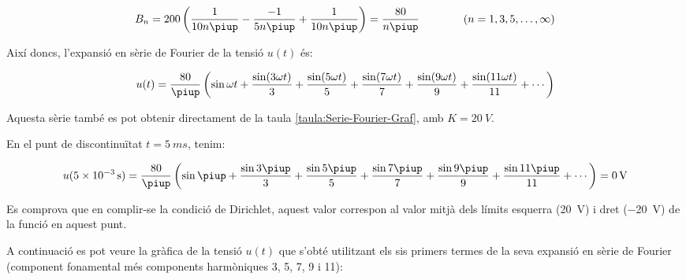 \begin{exemple}
    \[
        B_n = 200 \left( \frac{1}{10 n \piup} - \frac{-1}{5 n \piup} +
        \frac{1}{10 n \piup} \right) = \frac{80}{n \piup}
        \qquad\qquad(n=1,3,5,\ldots,\infty)
    \]

    Així doncs, l'expansió en sèrie de Fourier de la tensió $u(t)$ és:

    \[
        u(t) = \frac{80}{\piup} \left( \sin \omega t + \frac{\sin (3 \omega t)}{3} +
        \frac{\sin (5 \omega t)}{5} + \frac{\sin (7 \omega t)}{7} +
        \frac{\sin (9 \omega t)}{9} + \frac{\sin (11 \omega t)}{11} +\cdots\right)
    \]

    Aquesta sèrie també es pot obtenir directament de la taula \vref{taula:Serie-Fourier-Graf}, amb $K=\SI{20}{V}$.

    En el punt de discontinuïtat $t=\SI{5}{ms}$, tenim:

    \[
        u(\SI{5e-3}{s}) =\frac{80}{\piup} \left( \sin \piup + \frac{\sin 3 \piup}{3} +
        \frac{\sin 5 \piup}{5} + \frac{\sin 7 \piup}{7} +
        \frac{\sin 9 \piup}{9} +\frac{\sin 11 \piup}{11}+\cdots\right) = \SI{0}{V}
    \]

    Es comprova que en complir-se la condició de Dirichlet, aquest valor
    correspon al valor mitjà dels límits esquerra (\SI{20}{V}) i dret (\SI{-20}{V})  de
    la funció en aquest punt.

    A continuació es pot veure la gràfica de la tensió $u(t)$ que
    s'obté utilitzant els sis primers termes de la seva expansió en sèrie de Fourier (component fonamental més components harmòniques 3, 5, 7, 9 i 11):

    \begin{center}
        
    \end{center}


\end{exemple}
